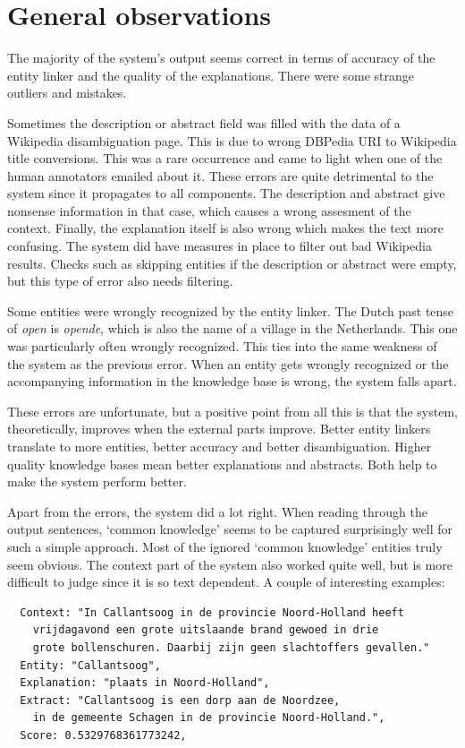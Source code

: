 \documentclass[
10pt, %
a4paper, %
oneside, %
headinclude,footinclude, %
] {book}%
\begin{document}
\section{General observations}
The majority of the system's output seems correct in terms of accuracy of the entity linker and the quality of the explanations.
There were some strange outliers and mistakes.

Sometimes the description or abstract field was filled with the data of a Wikipedia disambiguation page.
This is due to wrong DBPedia URI to Wikipedia title conversions.
This was a rare occurrence and came to light when one of the human annotators emailed about it.
These errors are quite detrimental to the system since it propagates to all components.
The description and abstract give nonsense information in that case, which causes a wrong assesment of the context.
Finally, the explanation itself is also wrong which makes the text more confusing.
The system did have measures in place to filter out bad Wikipedia results.
Checks such as skipping entities if the description or abstract were empty, but this type of error also needs filtering.

Some entities were wrongly recognized by the entity linker.
The Dutch past tense of \textit{open} is \textit{opende}, which is also the name of a village in the Netherlands.
This one was particularly often wrongly recognized.
This ties into the same weakness of the system as the previous error.
When an entity gets wrongly recognized or the accompanying information in the knowledge base is wrong, the system falls apart.

These errors are unfortunate, but a positive point from all this is that the system, theoretically, improves when the external parts improve.
Better entity linkers translate to more entities, better accuracy and better disambiguation.
Higher quality knowledge bases mean better explanations and abstracts.
Both help to make the system perform better.

Apart from the errors, the system did a lot right.
When reading through the output sentences, `common knowledge' seems to be captured surprisingly well for such a simple approach.
Most of the ignored `common knowledge' entities truly seem obvious.
The context part of the system also worked quite well, but is more difficult to judge since it is so text dependent.
A couple of interesting examples:

\newpage

\begin{verbatim}
  Context: "In Callantsoog in de provincie Noord-Holland heeft
    vrijdagavond een grote uitslaande brand gewoed in drie
    grote bollenschuren. Daarbij zijn geen slachtoffers gevallen."
  Entity: "Callantsoog",
  Explanation: "plaats in Noord-Holland",
  Extract: "Callantsoog is een dorp aan de Noordzee,
    in de gemeente Schagen in de provincie Noord-Holland.",
  Score: 0.5329768361773242,
\end{verbatim}
\end{document}
